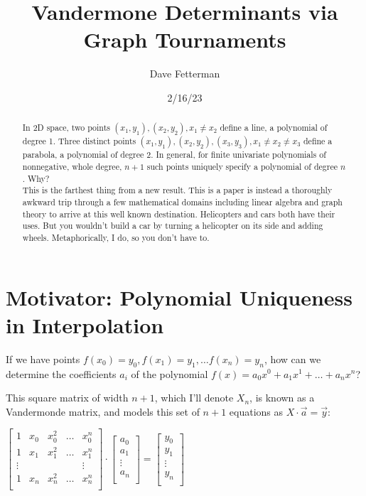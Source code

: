 \documentclass[11pt, oneside]{article} 	%
\title{Vandermone Determinants via Graph Tournaments}
\author{Dave Fetterman}
\affil{Obviously Unemployed}
\date{2/16/23}
\begin{document}
\maketitle

\begin{abstract}

In 2D space, two points $(x_1, y_1), (x_2, y_2), x_1 \neq x_2$ define a line, a polynomial of degree 1.  Three distinct points $(x_1, y_1), (x_2, y_2), (x_3, y_3), x_1 \neq x_2 \neq x_3$ define a parabola, a polynomial of degree 2.  In general, for finite univariate polynomials of nonnegative, whole degree, $n+1$ such points uniquely specify a polynomial of degree $n$.  Why?
\\

This is the farthest thing from a new result. This is a paper is instead a thoroughly awkward trip through a few mathematical domains including linear algebra and graph theory to arrive at this well known destination. Helicopters and cars both have their uses. But you wouldn't build a car by turning a helicopter on its side and adding wheels.  Metaphorically, I do, so you don't have to.

\end{abstract}

\section{Motivator: Polynomial Uniqueness in Interpolation}

If we have points $f(x_0) = y_0, f(x_1) = y_1,  \ldots f(x_{n}) = y_{n}$, how can we determine the coefficients $a_i$ of the polynomial $f(x) = a_0x^0 + a_1x^1 + \ldots + a_nx^n$?

This square matrix of width $n+1$, which I'll denote $X_n$, is known as a Vandermonde matrix\cite{1}, and models this set of $n+1$ equations as $X \cdot \vec{a} = \vec{y}$:

 $\begin{bmatrix}
1 & x_0 & x_0^2 & \ldots & x_0^{n} \\
1 & x_1 & x_1^2 & \ldots & x_1^{n} \\
\vdots & & & & \vdots  \\
1 & x_{n} & x_{n}^2 & \ldots & x_{n}^{n} \\
\end{bmatrix}
\cdot 
\begin{bmatrix}
a_0 \\
a_1 \\
\vdots \\
a_n \\
\end{bmatrix}
=
\begin{bmatrix}
y_0 \\
y_1 \\
\vdots \\
y_{n} \\
\end{bmatrix}
$
\\
\end{document}
